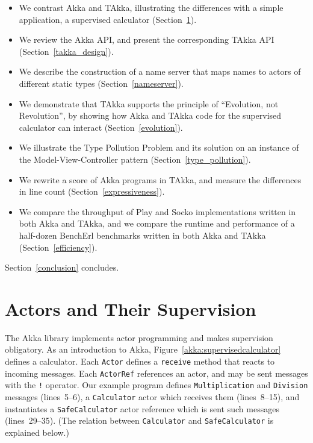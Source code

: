 \vspace{-8pt}
\begin{itemize}\setlength{\itemsep}{0pt}
\item We contrast Akka and TAkka, illustrating the differences with a
  simple application, a supervised calculator (Section~\ref{actor}).

\item We review the Akka API, and present the corresponding TAkka API
  (Section~\ref{takka_design}).

\item We describe the construction of a name server that maps names to
  actors of different static types (Section~\ref{nameserver}).

\item We demonstrate that TAkka supports the principle of
  ``Evolution, not Revolution'', by showing how Akka and TAkka code
  for the supervised calculator can interact (Section~\ref{evolution}).

\item We illustrate the Type Pollution Problem and its solution
  on an instance of the Model-View-Controller pattern (Section~\ref{type_pollution}).

\item We rewrite a score of Akka programs in TAkka, and measure the
  differences in line count (Section~\ref{expressiveness}).

\item We compare the throughput of Play and Socko implementations
  written in both Akka and TAkka, and we compare the runtime and
  performance of a half-dozen BenchErl benchmarks written in both
  Akka and TAkka (Section~\ref{efficiency}).
\end{itemize}
\vspace{-5pt}
Section~\ref{conclusion} concludes.


\section{Actors and Their Supervision}
\label{actor}

The Akka library \citep{akka_doc} implements actor programming and
makes supervision obligatory. As an introduction to Akka,
Figure~\ref{akka:supervisedcalculator} defines a calculator.
Each {\tt Actor} defines a {\tt receive} method that reacts to
incoming messages. Each {\tt ActorRef} references an actor, and
may be sent messages with the {\tt !} operator. Our example
program defines {\tt Multiplication} and {\tt Division} messages
(lines~5--6), a {\tt Calculator} actor which receives them
(lines~8--15), and instantiates a {\tt SafeCalculator} actor
reference which is sent such messages (lines~29--35).
(The relation between {\tt Calculator} and {\tt SafeCalculator}
is explained below.)

